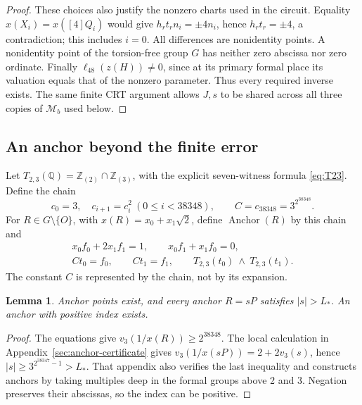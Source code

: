 \documentclass[11pt]{article}
\newtheorem{lemma}[theorem]{Lemma}
\theoremstyle{definition}
\newcommand{\Q}{\mathbb Q}\newcommand{\Z}{\mathbb Z}
\begin{document}
\begin{proof}
These choices also justify the nonzero charts used in the circuit.
Equality \(x(X_i)=x([4]Q_i)\) would give
\(h_rt_rn_i=\pm4n_i\), hence \(h_rt_r=\pm4\), a contradiction;
this includes \(i=0\). All differences are nonidentity points.
A nonidentity point of the torsion-free group \(G\) has neither
zero abscissa nor zero ordinate. Finally
\(\ell_{48}(z(H))\ne0\), since at its primary formal place its
valuation equals that of the nonzero parameter. Thus every required
inverse exists. The same finite CRT argument allows \(J,s\) to be
shared across all three copies of \(\mathcal M_b\) used below.
\end{proof}

\subsection{An anchor beyond the finite error}\label{sec:anchor}
Let \(T_{2,3}(\Q)=\Z_{(2)}\cap\Z_{(3)}\), with the explicit
seven-witness formula \eqref{eq:T23}. Define the chain
\[
 c_0=3,\quad c_{i+1}=c_i^2\ (0\le i<38348),
 \qquad C=c_{38348}=3^{2^{38348}}.
\]
For \(R\in G\setminus\{O\}\), with
\(x(R)=x_0+x_1\sqrt2\), define \(\operatorname{Anchor}(R)\)
by this chain and
\begin{equation}\label{eq:anchor}
\begin{gathered}
 x_0f_0+2x_1f_1=1,\qquad x_0f_1+x_1f_0=0,\\
 Ct_0=f_0,\qquad Ct_1=f_1,\qquad
 T_{2,3}(t_0)\ \wedge\ T_{2,3}(t_1).
\end{gathered}
\end{equation}
The constant \(C\) is represented by the chain, not by its expansion.

\begin{lemma}\label{lem:anchor-exists}
Anchor points exist, and every anchor \(R=sP\) satisfies
\(|s|>L_*\). An anchor with positive index exists.
\end{lemma}
\begin{proof}
The equations give \(v_3(1/x(R))\ge2^{38348}\).
The local calculation in Appendix~\ref{sec:anchor-certificate}
gives \(v_3(1/x(sP))=2+2v_3(s)\), hence
\(\lvert s\rvert\ge3^{2^{38347}-1}>L_*\).
That appendix also verifies the last inequality and constructs anchors
by taking multiples deep in the formal groups above 2 and 3.
Negation preserves their abscissas, so the index can be positive.
\end{proof}
\end{document}
